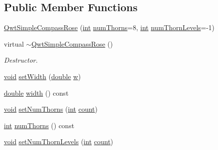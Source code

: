 \subsection*{Public Member Functions}
\begin{DoxyCompactItemize}
\item 
\hyperlink{class_qwt_simple_compass_rose_a66cc98efe5717eaf11fb0e713cd1aa21}{Qwt\-Simple\-Compass\-Rose} (\hyperlink{ioapi_8h_a787fa3cf048117ba7123753c1e74fcd6}{int} \hyperlink{class_qwt_simple_compass_rose_a7c3270789e94e94b8d515b04372bfe0b}{num\-Thorns}=8, \hyperlink{ioapi_8h_a787fa3cf048117ba7123753c1e74fcd6}{int} \hyperlink{class_qwt_simple_compass_rose_a8fa418ee344d934d556fa5719cd5ece5}{num\-Thorn\-Levels}=-\/1)
\item 
virtual \hyperlink{class_qwt_simple_compass_rose_a157304c9a535126d33a80df9a9dad292}{$\sim$\-Qwt\-Simple\-Compass\-Rose} ()
\begin{DoxyCompactList}\small\item\em Destructor. \end{DoxyCompactList}\item 
\hyperlink{group___u_a_v_objects_plugin_ga444cf2ff3f0ecbe028adce838d373f5c}{void} \hyperlink{class_qwt_simple_compass_rose_ae4067a436f45d2f2ca23d8233539566b}{set\-Width} (\hyperlink{_super_l_u_support_8h_a8956b2b9f49bf918deed98379d159ca7}{double} \hyperlink{glext_8h_ac1795f3b2fee217274b85c2750e1a889}{w})
\item 
\hyperlink{_super_l_u_support_8h_a8956b2b9f49bf918deed98379d159ca7}{double} \hyperlink{class_qwt_simple_compass_rose_a28e7dcd6574c6239f5d15cdda93ac835}{width} () const 
\item 
\hyperlink{group___u_a_v_objects_plugin_ga444cf2ff3f0ecbe028adce838d373f5c}{void} \hyperlink{class_qwt_simple_compass_rose_a3c86abb463eb4741d1776318d6fa557b}{set\-Num\-Thorns} (\hyperlink{ioapi_8h_a787fa3cf048117ba7123753c1e74fcd6}{int} \hyperlink{glext_8h_a5b40aca7a9682963dd00a8f5aef0a901}{count})
\item 
\hyperlink{ioapi_8h_a787fa3cf048117ba7123753c1e74fcd6}{int} \hyperlink{class_qwt_simple_compass_rose_a7c3270789e94e94b8d515b04372bfe0b}{num\-Thorns} () const 
\item 
\hyperlink{group___u_a_v_objects_plugin_ga444cf2ff3f0ecbe028adce838d373f5c}{void} \hyperlink{class_qwt_simple_compass_rose_ad91026da3b586a3193a264401221a275}{set\-Num\-Thorn\-Levels} (\hyperlink{ioapi_8h_a787fa3cf048117ba7123753c1e74fcd6}{int} \hyperlink{glext_8h_a5b40aca7a9682963dd00a8f5aef0a901}{count})
\item 

\end{DoxyCompactItemize}

